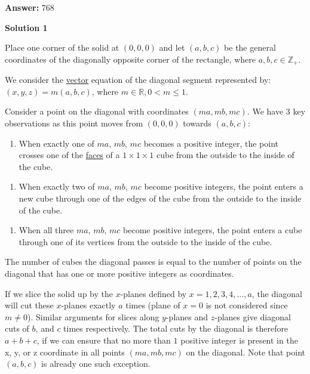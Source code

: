 \begin{enumerate}
 
 \textbf{Answer: }768



\textbf{Solution 1}

Place one corner of the solid at $(0,0,0)$ and let $(a,b,c)$ be the general coordinates of the diagonally opposite corner of the rectangle, where $a, b, c \in \mathbb{Z_{+}}$.

 We consider the \href{https://artofproblemsolving.com/wiki/index.php?title=Vector}{vector} equation of the diagonal segment represented by:$(x, y, z) =m (a, b, c)$, where $m \in \mathbb{R}, 0 < m \le 1$.

 Consider a point on the diagonal with coordinates $(ma, mb, mc)$. We have 3 key observations as this point moves from $(0,0,0)$ towards $(a,b,c)$:

 
            \begin{enumerate}
        \item When exactly one of $ma$, $mb$, $mc$ becomes a positive integer, the point crosses one of the \href{https://artofproblemsolving.com/wiki/index.php?title=Face}{faces} of a $1 \times 1 \times 1$ cube from the outside to the inside of the cube.
            \end{enumerate}
            
            \begin{enumerate}
        \item When exactly two of $ma$, $mb$, $mc$ become positive integers, the point enters a new cube through one of the edges of the cube from the outside to the inside of the cube.
            \end{enumerate}
            
            \begin{enumerate}
        \item When all three $ma$, $mb$, $mc$ become positive integers, the point enters a cube through one of its vertices from the outside to the inside of the cube.
            \end{enumerate}
            
The number of cubes the diagonal passes is equal to the number of points on the diagonal that has one or more positive integers as coordinates.

 If we slice the solid up by the $x$-planes defined by $x=1,2,3,4, \ldots, a$, the diagonal will cut these $x$-planes exactly $a$ times (plane of $x=0$ is not considered since $m \ne 0$). Similar arguments for slices along $y$-planes and $z$-planes give diagonal cuts of $b$, and $c$ times respectively. The total cuts by the diagonal is therefore $a+b+c$, if we can ensure that no more than $1$ positive integer is present in the x, y, or z coordinate in all points $(ma,mb,mc)$ on the diagonal. Note that point $(a,b,c)$ is already one such exception.


\end{enumerate}
